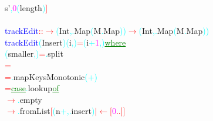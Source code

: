 {\rm{}s'}\textcolor{cyan}{,}\hsspace \textcolor{magenta}{0}\hsspace \textcolor{cyan}{(}{\rm{}length}\textcolor{cyan}{)}\textcolor{red}{]}\\\\\textcolor{blue}{trackEdit}\hsspace \textcolor{red}{::}\hsspace \textcolor{red}{\ensuremath{\rightarrow}}\hsspace \textcolor{cyan}{(}{\rm{}Int}\textcolor{cyan}{,}\textcolor{cyan}{.}{\rm{}Map}\hsspace \textcolor{cyan}{(}{\rm{}M}\textcolor{cyan}{.}{\rm{}Map}\textcolor{cyan}{)}\textcolor{cyan}{)}\hsspace \textcolor{red}{\ensuremath{\rightarrow}}\hsspace \textcolor{cyan}{(}{\rm{}Int}\textcolor{cyan}{,}\textcolor{cyan}{.}{\rm{}Map}\hsspace \textcolor{cyan}{(}{\rm{}M}\textcolor{cyan}{.}{\rm{}Map}\textcolor{cyan}{)}\textcolor{cyan}{)}\\\textcolor{blue}{trackEdit}\hsspace \textcolor{cyan}{(}{\rm{}Insert}\textcolor{cyan}{)}\hsspace \textcolor{cyan}{(}{\rm{}i}\textcolor{cyan}{,}\textcolor{cyan}{)}\hsspace \textcolor{red}{=}\hsspace \textcolor{cyan}{(}{\rm{}i}\hsspace \textcolor{cyan}{+}\hsspace \textcolor{magenta}{1}\textcolor{cyan}{,}\textcolor{cyan}{)}\hsspace \textcolor{green}{\underline{where}}\\\hstab \textcolor{cyan}{(}{\rm{}smaller}\textcolor{cyan}{,}\textcolor{cyan}{)}\hsspace \textcolor{red}{=}\textcolor{cyan}{.}{\rm{}split}\\\hsspace \hsspace \hsspace \hsspace \textcolor{red}{=}\\\hsspace \textcolor{red}{=}\textcolor{cyan}{.}{\rm{}mapKeysMonotonic}\hsspace \textcolor{cyan}{(}\textcolor{cyan}{+}\textcolor{cyan}{)}\\\hsspace \hsspace \textcolor{red}{=}\hsspace \textcolor{green}{\underline{case}}\textcolor{cyan}{.}{\rm{}lookup}\hsspace \textcolor{green}{\underline{of}}\\\hstab {}\hsspace \textcolor{red}{\ensuremath{\rightarrow}}\textcolor{cyan}{.}{\rm{}empty}\\\hstab {}\hsspace \textcolor{red}{\ensuremath{\rightarrow}}\textcolor{cyan}{.}{\rm{}fromList}\hsspace \textcolor{red}{[}\textcolor{cyan}{(}{\rm{}n}\hsspace \textcolor{cyan}{+}\textcolor{cyan}{,}\textcolor{cyan}{.}{\rm{}insert}\textcolor{cyan}{)}\hsspace \textcolor{red}{\ensuremath{|}}\hsspace \textcolor{red}{\ensuremath{\leftarrow}}\hsspace \textcolor{red}{[}\textcolor{magenta}{0}\hsspace \textcolor{red}{..}\textcolor{red}{]}\textcolor{red}{]}\\\hsspace \hsspace \hsspace \hsspace 